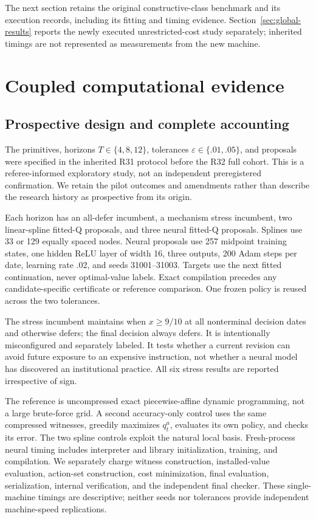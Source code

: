 The next section retains the original constructive-class benchmark and its execution records, including its fitting and timing evidence. Section~\ref{sec:global-results} reports the newly executed unrestricted-cost study separately; inherited timings are not represented as measurements from the new machine.

\section{Coupled computational evidence}\label{sec:results}
\subsection{Prospective design and complete accounting}
The primitives, horizons $T\in\{4,8,12\}$, tolerances $\varepsilon\in\{.01,.05\}$, and proposals were specified in the inherited R31 protocol before the R32 full cohort. This is a referee-informed exploratory study, not an independent preregistered confirmation. We retain the pilot outcomes and amendments rather than describe the research history as prospective from its origin.

Each horizon has an all-defer incumbent, a mechanism stress incumbent, two linear-spline fitted-Q proposals, and three neural fitted-Q proposals. Splines use 33 or 129 equally spaced nodes. Neural proposals use 257 midpoint training states, one hidden ReLU layer of width 16, three outputs, 200 Adam steps per date, learning rate .02, and seeds 31001--31003. Targets use the next fitted continuation, never optimal-value labels. Exact compilation precedes any candidate-specific certificate or reference comparison. One frozen policy is reused across the two tolerances.

The stress incumbent maintains when $x\ge9/10$ at all nonterminal decision dates and otherwise defers; the final decision always defers. It is intentionally misconfigured and separately labeled. It tests whether a current revision can avoid future exposure to an expensive instruction, not whether a neural model has discovered an institutional practice. All six stress results are reported irrespective of sign.

The reference is uncompressed exact piecewise-affine dynamic programming, not a large brute-force grid. A second accuracy-only control uses the same compressed witnesses, greedily maximizes $q_t^a$, evaluates its own policy, and checks its error. The two spline controls exploit the natural local basis. Fresh-process neural timing includes interpreter and library initialization, training, and compilation. We separately charge witness construction, installed-value evaluation, action-set construction, cost minimization, final evaluation, serialization, internal verification, and the independent final checker. These single-machine timings are descriptive; neither seeds nor tolerances provide independent machine-speed replications.

